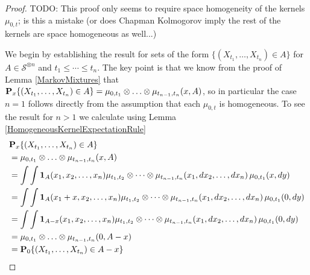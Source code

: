 \begin{proof}
TODO: This proof only seems to require space homogeneity of the
kernels $\mu_{0,t}$; is this a mistake (or does Chapman Kolmogorov
imply the rest of the kernels are space homogeneous as well...)

We begin by establishing the result for sets of the form $\lbrace (X_{t_1},
\dotsc, X_{t_n}) \in A \rbrace$ for $A \in \mathcal{S}^{\otimes n}$ and $t_1 \leq
\cdots \leq t_n$.  The key point is that we know from the proof of
Lemma \ref{MarkovMixtures} that $\sprobability{(X_{t_1},
\dotsc, X_{t_n}) \in A }{x} = \mu_{0, t_1} \otimes \dotsc \otimes
\mu_{t_{n-1}, t_n}(x, A)$, so in particular the case $n=1$ follows
directly from the assumption that each $\mu_{0, t}$ is homogeneous.
To see the result for $n > 1$ we calculate using Lemma \ref{HomogeneousKernelExpectationRule}
\begin{align*}
&\sprobability{(X_{t_1},\dotsc, X_{t_n}) \in A }{x} \\
&= \mu_{0, t_1} \otimes \dotsc \otimes \mu_{t_{n-1}, t_n}(x, A) \\
&= \int \int \characteristic{A}(x_1, x_2, \dotsc, x_n) \mu_{t_1, t_2} \otimes \cdots \otimes \mu_{t_{n-1},
  t_n}(x_1, dx_2, \dotsc, dx_n) \, \mu_{0,t_1}(x, dy) \\
&= \int \int \characteristic{A}(x_1+x, x_2, \dotsc, x_n) \mu_{t_1, t_2} \otimes \cdots \otimes \mu_{t_{n-1},
  t_n}(x_1, dx_2, \dotsc, dx_n) \, \mu_{0,t_1}(0, dy) \\
&= \int \int \characteristic{A-x}(x_1, x_2, \dotsc, x_n) \mu_{t_1, t_2} \otimes \cdots \otimes \mu_{t_{n-1},
  t_n}(x_1, dx_2, \dotsc, dx_n) \, \mu_{0,t_1}(0, dy) \\
&= \mu_{0, t_1} \otimes \dotsc \otimes \mu_{t_{n-1}, t_n}(0, A-x) \\
&=\sprobability{(X_{t_1},\dotsc, X_{t_n}) \in A - x}{0} \\
\end{align*}


\end{proof}
